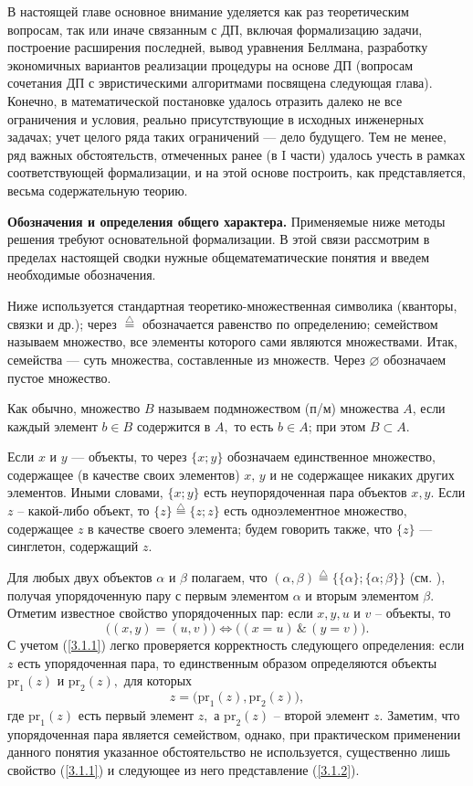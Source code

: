 \documentclass[11pt,twoside,openany]{report}
\newcommand{\bfn}{\begin{equation}}
\newcommand{\efn}{\end{equation}}
\newcommand{\df}{\stackrel{\triangle}{=}}
\newcommand{\al}{\alpha}
\newcommand{\su}{\subset}
\newcommand{\emp}{\varnothing}
\begin{document}
В настоящей главе основное внимание уделяется
как раз теоретическим вопросам, так или
иначе связанным с ДП,
включая формализацию задачи,
построение расширения последней,
вывод уравнения Беллмана,
разработку экономичных вариантов реализации процедуры на
основе ДП
(вопросам сочетания ДП с эвристическими алгоритмами посвящена следующая глава).
Конечно, в математической постановке
удалось отразить далеко не все ограничения и условия,
реально присутствующие в исходных инженерных задачах;
учет целого ряда таких
ограничений --- дело будущего.
Тем не менее, ряд важных обстоятельств, отмеченных ранее
(в I части)
удалось учесть в рамках соответствующей формализации,
и на этой основе построить,
как представляется, весьма содержательную теорию.

{\bf Обозначения и определения общего характера.}
Применяемые ниже методы решения требуют основательной формализации.
В этой связи рассмотрим в пределах настоящей сводки
нужные общематематические понятия и введем
необходимые обозначения.

Ниже используется стандартная
теоретико-множественная символика
(кванторы, связки и др.);
через $\df$
обозначается равенство по определению;
семейством называем множество,
все элементы которого сами являются множествами.
Итак, семейства --- суть множества,
составленные из множеств.
Через $\emp$ обозначаем пустое множество.

Как обычно,
множество $B$ называем подмножеством (п/м)
множества $A$,
если каждый
элемент $b\in B$ содержится в $A,$
то есть $b\in A$;
при этом $B\su A.$

Если $x$ и $y$ --- объекты,
то через $\{x;y\}$
обозначаем единственное множество, содержащее
(в качестве своих элементов)
$x,\,y$  и не содержащее никаких других
элементов.
Иными словами, $\{x;y\}$
есть неупорядоченная пара объектов $x, y.$
Если
$z$ -- какой-либо объект,
то $\{z\} \df \{z;z\}$
есть одноэлементное множество,
содержащее $z$ в качестве своего элемента;
будем говорить также, что $\{z\}$ ---
синглетон, содержащий $z.$

Для любых двух объектов $\al$ и $\beta$ полагаем,
что
$(\al,\beta) \df \bigl\{\{\al\};\{\al;\beta\}\bigl\}$
(см. \cite[67]{Cha6`}),
получая
упорядоченную пару с первым элементом $\al$ и вторым элементом $\beta.$
Отметим известное свойство упорядоченных пар:
если $x, y, u$ и $v$ --
объекты,
то \cite[67]{Cha6`}
\bfn\label{3.1.1}\bigl((x,y) = (u,v)\bigl) \Longleftrightarrow
\bigl((x = u)\,\&\,(y = v)\bigl).
\efn
С учетом (\ref{3.1.1}) легко проверяется корректность следующего определения:
если $z$ есть упорядоченная пара, то единственным образом  определяются объекты
$\mathrm{pr}_1(z)$ и $\mathrm{pr}_2(z),$
для которых
\bfn\label{3.1.2}z = \bigl(\mathrm{pr}_1(z),\mathrm{pr}_2(z)\bigl),
\efn
где
$\mathrm{pr}_1(z)$ есть первый элемент $z,$
а $\mathrm{pr}_2(z)$ -- второй элемент
$z.$
Заметим, что
упорядоченная пара является семейством,
однако,
при практическом применении данного понятия
указанное обстоятельство не используется,
существенно лишь свойство (\ref{3.1.1})
и следующее из него представление (\ref{3.1.2}).
\end{document}
